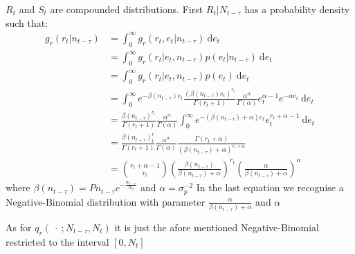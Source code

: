 \documentclass{article}
\begin{document}
	$R_t$ and $S_t$ are compounded distributions.
	First $R_t | N_{t-\tau}$ has a probability density such that:
	\begin{equation*}
	\begin{split}
			g_r(r_t | n_{t-\tau}) & = \int_{0}^{\infty}g_r(r_t, e_t | n_{t-\tau})\ \mathrm{d}e_t \\
			& = \int_{0}^{\infty}g_r(r_t | e_t, n_{t-\tau})p(e_t | n_{t-\tau})\ \mathrm{d}e_t \\
			& = \int_{0}^{\infty}g_r(r_t | e_t, n_{t-\tau})p(e_t)\ \mathrm{d}e_t \\
			& = \int_{0}^{\infty}e^{-\beta(n_{t-\tau})e_t}\frac{(\beta(n_{t-\tau})e_t)^{r_t}}{\Gamma(r_t+1)}\frac{\alpha^\alpha}{\Gamma(\alpha)}e_t^{\alpha-1}e^{-\alpha e_t}\ \mathrm{d}e_t \\
			& = \frac{\beta(n_{t-\tau})^{r_t}}{\Gamma(r_t+1)}\frac{\alpha^\alpha}{\Gamma(\alpha)}\int_{0}^{\infty}e^{-(\beta(n_{t-\tau})+\alpha)e_t}e_t^{r_t+\alpha-1}\ \mathrm{d}e_t \\
			& = \frac{\beta(n_{t-\tau})^r_t}{\Gamma(r_t+1)}\frac{\alpha^\alpha}{\Gamma(\alpha)}\frac{\Gamma(r_t+\alpha)}{(\beta(n_{t-\tau})+\alpha)^{r_t+\alpha}} \\
			& = \binom{r_t + \alpha - 1}{r_t}(\frac{\beta(n_{t-\tau})}{\beta(n_{t-\tau}) + \alpha})^{r_t}(\frac{\alpha}{\beta(n_{t-\tau}) + \alpha})^\alpha
	\end{split}
	\end{equation*}
	where $\beta(n_{t-\tau}) = Pn_{t-\tau}e^{-\frac{n_{t-\tau}}{N_0}}$ and $\alpha = \sigma_p^{-2}$
	In the last equation we recognise a Negative-Binomial distribution with parameter $\frac{\alpha}{\beta(n_{t-\tau}) + \alpha}$ and $\alpha$
	
	As for $q_r(\ \cdot \ ; N_{t-\tau}, N_t)$ it is just the afore mentioned Negative-Binomial restricted to the interval $[0, N_t]$
	
\end{document}
